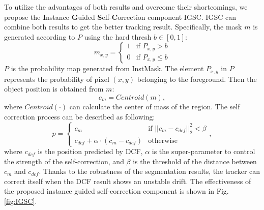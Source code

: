 \documentclass[review]{elsarticle}
\begin{document}
\begin{CJK*}{UTF8}{gbsn}
To utilize the advantages of both results and overcome their shortcomings, we propose the \textbf{I}nstance \textbf{G}uided \textbf{S}elf-\textbf{C}orrection component IGSC. IGSC can combine both results to get the better tracking result. Specifically, the mask $m$ is generated according to $P$ using the hard thresh $b \in [0, 1] $:
\begin{equation}
m_{x,y} = \left\{ \begin{array}{ll}
 1 & \textrm{if $P_{x,y} > b$}\\
 0 & \textrm{if $P_{x,y} \le b$}
 \end{array} \right.
\end{equation}
$P$ is the probability map generated from InstMask. The element $P_{x,y}$ in $P$ represents the probability of pixel $(x,y)$ belonging to the foreground.
Then the object position is obtained from $m$:
\begin{equation}
c_{m} = Centroid(m),
\end{equation}
where $Centroid(\mathord{\cdot})$ can calculate the center of mass of the region. The self correction process can be described as following:
\begin{equation}
p = \left\{ \begin{array}{ll}
 c_{m} & \textrm{if $||c_{m}-c_{dcf}||_2^2 < \beta$}\\
 c_{dcf} + \alpha \cdot (c_{m}-c_{dcf}) & \textrm{otherwise}
 \end{array} \right.,
\end{equation}
where $c_{dcf}$ is the position predicted by DCF, $\alpha$ is the super-parameter to control the strength of the self-correction, and  $\beta$ is the threshold of the distance between $c_{m}$ and $c_{dcf}$.
Thanks to the robustness of the segmentation results, the tracker can correct itself when the DCF result shows an unstable drift. The effectiveness of the proposed instance guided self-correction component is shown in Fig. \ref{fig:IGSC}.


\end{CJK*}
\end{document}

